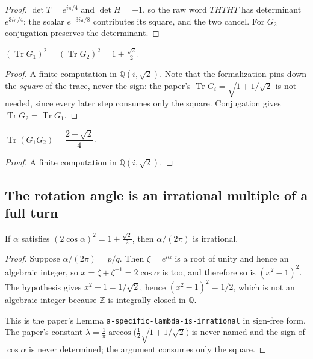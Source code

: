 \begin{proof}
  \leanok
  $\det T = e^{i\pi/4}$ and $\det H = -1$, so the raw word $THTHT$ has
  determinant $e^{3i\pi/4}$; the scalar $e^{-3i\pi/8}$ contributes its square,
  and the two cancel.  For $G_2$ conjugation preserves the determinant.
\end{proof}

\begin{lemma}
  \label{lem:g_trace}
  \leanok
  $(\operatorname{Tr} G_1)^2 = (\operatorname{Tr} G_2)^2 = 1 + \tfrac{\sqrt 2}{2}$.
\end{lemma}

\begin{proof}
  \leanok
  A finite computation in $\mathbb{Q}(i,\sqrt 2)$.  Note that the formalization
  pins down the \emph{square} of the trace, never the sign: the paper's
  $\operatorname{Tr} G_i = \sqrt{1 + 1/\sqrt2}$ is not needed, since every later
  step consumes only the square.  Conjugation gives
  $\operatorname{Tr} G_2 = \operatorname{Tr} G_1$.
\end{proof}

\begin{lemma}
  \label{lem:g1g2_trace}
  \leanok
  $\operatorname{Tr}(G_1 G_2) = \dfrac{2 + \sqrt 2}{4}$.
\end{lemma}

\begin{proof}
  \leanok
  A finite computation in $\mathbb{Q}(i,\sqrt 2)$.
\end{proof}

\subsection{The rotation angle is an irrational multiple of a full turn}

\begin{lemma}
  \label{lem:lambda_irrational}
  \leanok
  If $\alpha$ satisfies $(2\cos\alpha)^2 = 1 + \tfrac{\sqrt2}{2}$, then
  $\alpha/(2\pi)$ is irrational.
\end{lemma}

\begin{proof}
  \leanok
  Suppose $\alpha/(2\pi) = p/q$.  Then $\zeta = e^{i\alpha}$ is a root of unity
  and hence an algebraic integer, so $x = \zeta + \zeta^{-1} = 2\cos\alpha$ is
  too, and therefore so is $(x^2-1)^2$.  The hypothesis gives
  $x^2 - 1 = 1/\sqrt2$, hence $(x^2-1)^2 = 1/2$, which is not an algebraic
  integer because $\mathbb{Z}$ is integrally closed in $\mathbb{Q}$.

  This is the paper's Lemma \texttt{a-specific-lambda-is-irrational} in
  sign-free form.  The paper's constant
  $\lambda = \tfrac1\pi \arccos\!\big(\tfrac12\sqrt{1+1/\sqrt2}\big)$ is never
  named and the sign of $\cos\alpha$ is never determined; the argument consumes
  only the square.
\end{proof}

